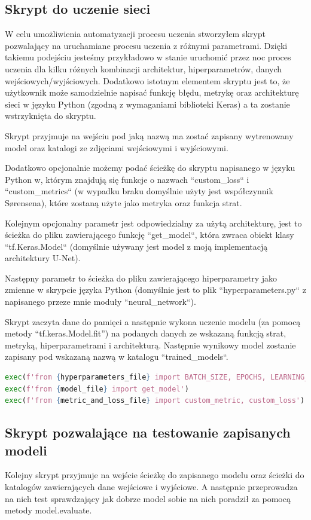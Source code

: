 \documentclass{article}
\begin{document}
\subsection{Skrypt do uczenie sieci}
W celu umożliwienia automatyzacji procesu uczenia stworzyłem skrypt pozwalający na uruchamiane procesu uczenia z różnymi parametrami.
Dzięki takiemu podejściu jesteśmy przykładowo w stanie uruchomić przez noc proces uczenia dla kilku różnych kombinacji architektur, hiperparametrów, danych wejściowych/wyjściowych. Dodatkowo istotnym elementem skryptu jest to, że użytkownik może samodzielnie napisać  funkcję błędu, metrykę oraz architekturę sieci w języku Python (zgodną z wymaganiami biblioteki Keras) a ta zostanie wstrzyknięta do skryptu.

Skrypt przyjmuje na wejściu pod jaką nazwą ma zostać zapisany wytrenowany model oraz katalogi ze zdjęciami wejściowymi i wyjściowymi.

Dodatkowo opcjonalnie możemy podać ścieżkę do skryptu napisanego w języku Python w, którym znajdują się funkcje o nazwach ``custom\_loss`` i ``custom\_metrics`` (w wypadku braku domyślnie użyty jest współczynnik Sørensena), które zostaną użyte jako metryka oraz funkcja strat.

Kolejnym opcjonalny parametr jest odpowiedzialny za użytą architekturę, jest to ścieżka do pliku zawierającego funkcję ``get\_model``, która zwraca obiekt klasy ``tf.Keras.Model`` (domyślnie używany jest model z moją implementacją architektury U-Net).

Następny parametr to ścieżka do pliku zawierającego hiperparametry jako zmienne w skrypcie języka Python (domyślnie jest to plik ``hyperparameters.py`` z napisanego przeze mnie moduły ``neural\_network``).

Skrypt zaczyta dane do pamięci a następnie wykona uczenie modelu (za pomocą metody ``tf.keras.Model.fit'') na podanych danych ze wskazaną funkcją strat, metryką, hiperparametrami i architekturą.
Następnie wynikowy model zostanie zapisany pod wskazaną nazwą w katalogu ``trained\_models``.
\begin{lstlisting}[caption={Dynamiczne wstrzykiwanie funkcji oraz stałych z innych skryptów},language=Python]
exec(f'from {hyperparameters_file} import BATCH_SIZE, EPOCHS, LEARNING_RATE, VALIDATION_SPLIT')
exec(f'from {model_file} import get_model')
exec(f'from {metric_and_loss_file} import custom_metric, custom_loss')
\end{lstlisting}
\subsection{Skrypt pozwalające na testowanie zapisanych modeli}
Kolejny skrypt przyjmuje na wejście ścieżkę do zapisanego modelu oraz ścieżki do katalogów zawierających dane wejściowe i wyjściowe.
A następnie przeprowadza na nich test sprawdzający jak dobrze model sobie na nich poradził za pomocą metody model.evaluate.
\end{document}
